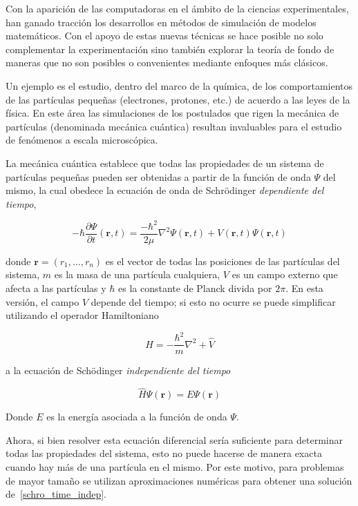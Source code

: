 Con la aparici\'on de las computadoras en el \'ambito de la ciencias experimentales, han
ganado tracci\'on los desarrollos en m\'etodos de simulaci\'on de modelos matem\'aticos.
Con el apoyo de estas nuevas t\'ecnicas se hace posible no solo
complementar la experimentaci\'on sino tambi\'en explorar la teor\'ia de fondo de maneras que
no son posibles o convenientes mediante enfoques m\'as cl\'asicos.

Un ejemplo es el estudio, dentro del marco de la qu\'imica, de los comportamientos de las
part\'iculas peque\~nas (electrones, protones, etc.) de acuerdo a las leyes de la f\'isica. En este \'area las
simulaciones de los postulados que rigen la mec\'anica de part\'iculas (denominada mec\'anica cu\'antica)
resultan invaluables para el estudio de fen\'omenos a escala microsc\'opica.

La mec\'anica cu\'antica establece que todas las propiedades de un sistema de part\'iculas peque\~nas
pueden ser obtenidas a partir de la funci\'on de onda $\Psi$ del mismo, la cual obedece la
ecuaci\'on de onda de Schr\"odinger \textit{dependiente del tiempo},

\begin{equation}
    \label{schro_time_dep}
    -\hbar\frac{\partial \Psi}{\partial t} (\mathbf{r},t) = \frac{-\hbar^2}{2\mu}\nabla^2 \Psi(\mathbf{r},t) + V(\mathbf{r},t) \Psi(\mathbf{r},t)
\end{equation}

donde $\mathbf{r} = (r_1,\dots,r_n)$ es el vector de todas las posiciones de las part\'iculas del sistema,
$m$ es la masa de una part\'icula cualquiera, $V$ es un campo externo que afecta a las part\'iculas y
$\hbar$ es la constante de Planck divida por $2\pi$. En esta versi\'on, el campo $V$ depende del tiempo; si
esto no ocurre se puede simplificar utilizando el operador Hamiltoniano

\begin{equation*}
    \hat{H} =  -\frac{\hbar^2}{m} \nabla^2 + \hat{V}
\end{equation*}

a la ecuaci\'on de Sch\"odinger \textit{independiente del tiempo}

\begin{equation}
    \label{schro_time_indep}
    \hat{H} \Psi(\mathbf{r}) = E \Psi(\mathbf{r})
\end{equation}

Donde $E$ es la energ\'ia asociada a la funci\'on de onda $\Psi$.

Ahora, si bien resolver esta ecuaci\'on diferencial ser\'ia suficiente para determinar todas las propiedades del sistema, esto no puede hacerse de
manera exacta cuando hay m\'as de una part\'icula en el mismo. Por este motivo, para problemas de mayor tama\~no se utilizan aproximaciones num\'ericas
para obtener una soluci\'on de~\ref{schro_time_indep}.

